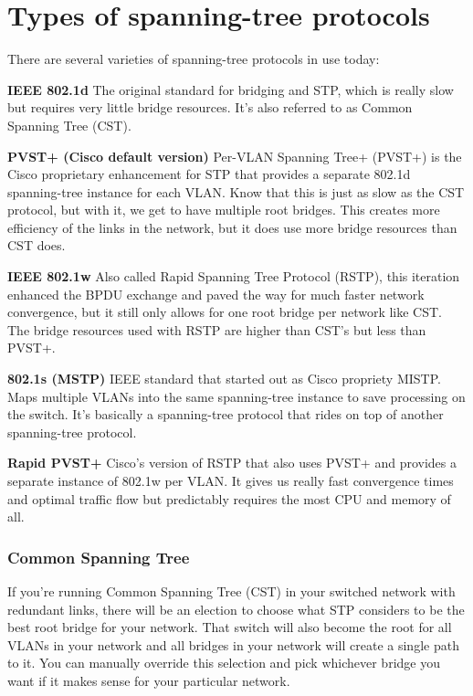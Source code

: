 \section{Types of spanning-tree protocols}

There are several varieties of spanning-tree protocols in use today:

\textbf{IEEE 802.1d} The original standard for bridging and STP, which
is really slow but requires very little bridge resources. It's also
referred to as Common Spanning Tree (CST).

\textbf{PVST+ (Cisco default version)} Per-VLAN Spanning Tree+ (PVST+)
is the Cisco proprietary enhancement for STP that provides a separate
802.1d spanning-tree instance for each VLAN. Know that this is just as
slow as the CST protocol, but with it, we get to have multiple root
bridges. This creates more efficiency of the links in the network, but
it does use more bridge resources than CST does.

\textbf{IEEE 802.1w} Also called Rapid Spanning Tree Protocol (RSTP),
this iteration enhanced the BPDU exchange and paved the way for much
faster network convergence, but it still only allows for one root bridge
per network like CST. The bridge resources used with RSTP are higher
than CST's but less than PVST+.

\textbf{802.1s (MSTP)} IEEE standard that started out as Cisco propriety
MISTP. Maps multiple VLANs into the same spanning-tree instance to save
processing on the switch. It's basically a spanning-tree protocol that
rides on top of another spanning-tree protocol.

\textbf{Rapid PVST+} Cisco's version of RSTP that also uses PVST+ and
provides a separate instance of 802.1w per VLAN. It gives us really fast
convergence times and optimal traffic flow but predictably requires the
most CPU and memory of all.

\subsubsection[Common Spanning
Tree]{\texorpdfstring{\protect\hypertarget{c15.xhtmlux5cux23c15-sec-13}{}{}Common
Spanning Tree}{Common Spanning Tree}}

If you're running Common Spanning Tree (CST) in your switched network
with redundant links, there will be an election to choose what STP
considers to be the best root bridge for your network. That switch will
also become the root for all VLANs in your network and all bridges in
your network will create a single path to it. You can manually override
this selection and pick whichever bridge you want if it makes sense for
your particular network.

